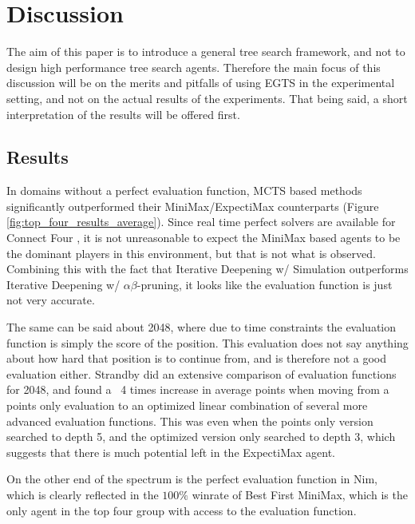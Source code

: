\section{Discussion}

The aim of this paper is to introduce a general tree search framework, and not to design high performance tree search agents. Therefore the main focus of this discussion will be on the merits and pitfalls of using EGTS in the experimental setting, and not on the actual results of the experiments. That being said, a short interpretation of the results will be offered first.

\subsection{Results}
In domains without a perfect evaluation function, MCTS based methods significantly outperformed their MiniMax/ExpectiMax counterparts (Figure \ref{fig:top_four_results_average}). Since real time perfect solvers are available for Connect Four \cite{Pons2019}, it is not unreasonable to expect the MiniMax based agents to be the dominant players in this environment, but that is not what is observed. Combining this with the fact that Iterative Deepening w/ Simulation outperforms Iterative Deepening w/ $\alpha\beta$-pruning, it looks like the evaluation function is just not very accurate.

The same can be said about 2048, where due to time constraints the evaluation function is simply the score of the position. This evaluation does not say anything about how hard that position is to continue from, and is therefore not a good evaluation either. Strandby \cite{Strandby2016} did an extensive comparison of evaluation functions for 2048, and found a ~4 times increase in average points when moving from a points only evaluation to an optimized linear combination of several more advanced evaluation functions. This was even when the points only version searched to depth 5, and the optimized version only searched to depth 3, which suggests that there is much potential left in the ExpectiMax agent.

On the other end of the spectrum is the perfect evaluation function in Nim, which is clearly reflected in the $100\%$ winrate of Best First MiniMax, which is the only agent in the top four group with access to the evaluation function.

